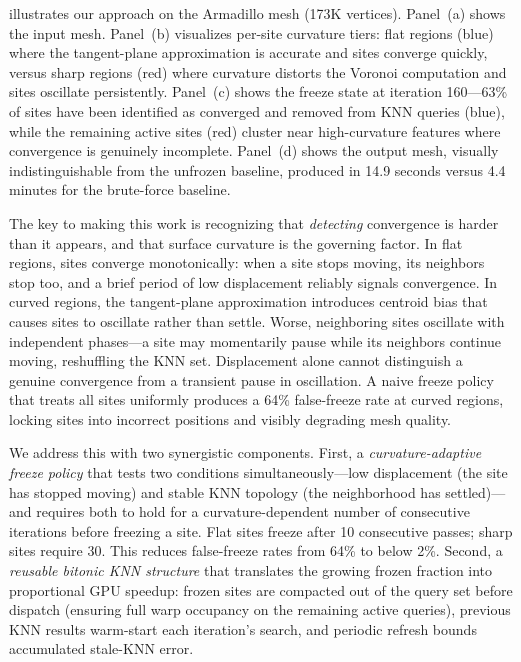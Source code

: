  illustrates our approach on the Armadillo mesh (173K vertices). Panel~(a) shows the input mesh. Panel~(b) visualizes per-site curvature tiers: flat regions (blue) where the tangent-plane approximation is accurate and sites converge quickly, versus sharp regions (red) where curvature distorts the Voronoi computation and sites oscillate persistently. Panel~(c) shows the freeze state at iteration 160---63\% of sites have been identified as converged and removed from KNN queries (blue), while the remaining active sites (red) cluster near high-curvature features where convergence is genuinely incomplete. Panel~(d) shows the output mesh, visually indistinguishable from the unfrozen baseline, produced in 14.9 seconds versus 4.4 minutes for the brute-force baseline.

The key to making this work is recognizing that \emph{detecting} convergence is harder than it appears, and that surface curvature is the governing factor. In flat regions, sites converge monotonically: when a site stops moving, its neighbors stop too, and a brief period of low displacement reliably signals convergence. In curved regions, the tangent-plane approximation introduces centroid bias that causes sites to oscillate rather than settle. Worse, neighboring sites oscillate with independent phases---a site may momentarily pause while its neighbors continue moving, reshuffling the KNN set. Displacement alone cannot distinguish a genuine convergence from a transient pause in oscillation. A naive freeze policy that treats all sites uniformly produces a 64\% false-freeze rate at curved regions, locking sites into incorrect positions and visibly degrading mesh quality.

We address this with two synergistic components. First, a \emph{curvature-adaptive freeze policy} that tests two conditions simultaneously---low displacement (the site has stopped moving) and stable KNN topology (the neighborhood has settled)---and requires both to hold for a curvature-dependent number of consecutive iterations before freezing a site. Flat sites freeze after 10 consecutive passes; sharp sites require 30. This reduces false-freeze rates from 64\% to below 2\%. Second, a \emph{reusable bitonic KNN structure} that translates the growing frozen fraction into proportional GPU speedup: frozen sites are compacted out of the query set before dispatch (ensuring full warp occupancy on the remaining active queries), previous KNN results warm-start each iteration's search, and periodic refresh bounds accumulated stale-KNN error.

